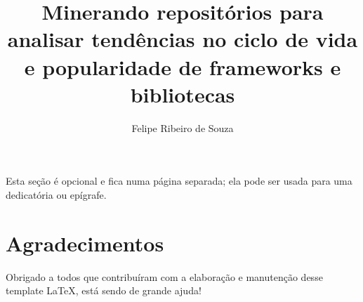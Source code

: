 \documentclass[a4paper,12pt,twoside,english,brazilian]{book}
\title{Minerando repositórios para analisar tendências no ciclo de vida e popularidade de frameworks e bibliotecas}
\author[masc]{Felipe Ribeiro de Souza}
\begin{document}

\frontmatter

\pagestyle{plain}

\onehalfspacing %

\maketitle %


\begin{dedicatoria}
Esta seção é opcional e fica numa página separada; ela pode ser usada para
uma dedicatória ou epígrafe.
\end{dedicatoria}


\chapter*{Agradecimentos}

Obrigado a todos que contribuíram com a elaboração e manutenção desse template \LaTeX, está sendo de grande ajuda!





\cleardoublepage
\end{document}
